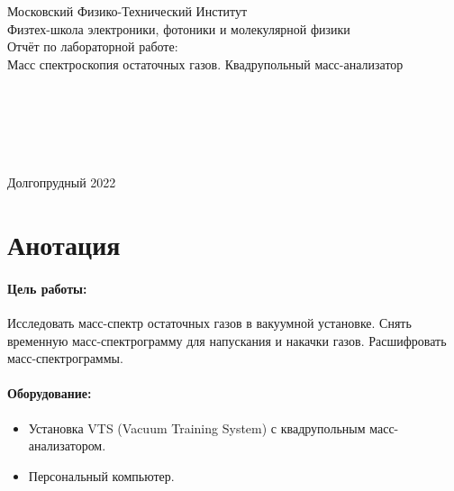 \documentclass[a4paper,12pt]{article} %
\begin{document}



\begin{center}
{\LARGE Московский Физико-Технический Институт}
\\
{\large Физтех-школа электроники, фотоники и молекулярной физики }
\\
\vspace{8cm}
{\LARGE Отчёт по лабораторной работе:}
\\
{\Huge Масс спектроскопия остаточных газов. Квадрупольный масс-анализатор} 
\\
\vspace{5cm}
\raggedright 
\hspace{8cm}{\large Выполнили работу студенты }\\
\hspace{8cm}{\large группы Б04-005:}\\
\hspace{8cm}{\large Давыдов Владислав}\\
\hspace{8cm}{\large Карташов Констанин}\\
\hspace{8cm}{\large Корнеев Николай}\\

\vspace{\fill}
\center
{\large Долгопрудный 2022}

\end{center}

\newpage


\section{Анотация}

\paragraph{Цель работы:} 
Исследовать масс-спектр остаточных газов в вакуумной установке. Снять временную масс-спектрограмму для напускания и накачки газов. Расшифровать масс-спектрограммы.

\paragraph{Оборудование:}
\begin{itemize}
\renewcommand{\labelitemi}{$\triangleright$}
\itemsep0em
\item Установка VTS (Vacuum Training System) с квадрупольным масс-анализатором.
\item Персональный компьютер.
\end{itemize}
\end{document}
